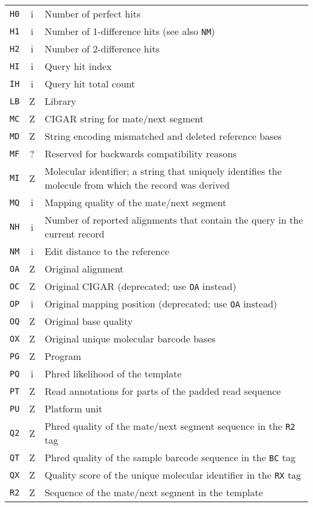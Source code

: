 \documentclass[10pt]{article}
\begin{document}
\begin{center}
\begin{longtable}{ccp{12.5cm}}
  {\tt H0} & i & Number of perfect hits \\
  {\tt H1} & i & Number of 1-difference hits (see also {\tt NM}) \\
  {\tt H2} & i & Number of 2-difference hits \\
  {\tt HI} & i & Query hit index \\
  {\tt IH} & i & Query hit total count \\
  {\tt LB} & Z & Library \\
  {\tt MC} & Z & CIGAR string for mate/next segment \\
  {\tt MD} & Z & String encoding mismatched and deleted reference bases \\
  {\tt MF} & ? & Reserved for backwards compatibility reasons \\
  {\tt MI} & Z & Molecular identifier; a string that uniquely identifies the molecule from which the record was derived \\
  {\tt MQ} & i & Mapping quality of the mate/next segment \\
  {\tt NH} & i & Number of reported alignments that contain the query in the current record \\
  {\tt NM} & i & Edit distance to the reference \\
  {\tt OA} & Z & Original alignment \\
  {\tt OC} & Z & Original CIGAR (deprecated; use {\tt OA} instead) \\
  {\tt OP} & i & Original mapping position (deprecated; use {\tt OA} instead) \\
  {\tt OQ} & Z & Original base quality \\
  {\tt OX} & Z & Original unique molecular barcode bases \\
  {\tt PG} & Z & Program \\
  {\tt PQ} & i & Phred likelihood of the template \\
  {\tt PT} & Z & Read annotations for parts of the padded read sequence \\
  {\tt PU} & Z & Platform unit \\
  {\tt Q2} & Z & Phred quality of the mate/next segment sequence in the {\tt R2} tag \\
  {\tt QT} & Z & Phred quality of the sample barcode sequence in the {\tt BC} tag \\
  {\tt QX} & Z & Quality score of the unique molecular identifier in the {\tt RX} tag \\
  {\tt R2} & Z & Sequence of the mate/next segment in the template \\

\end{longtable}
\end{center}
\end{document}
